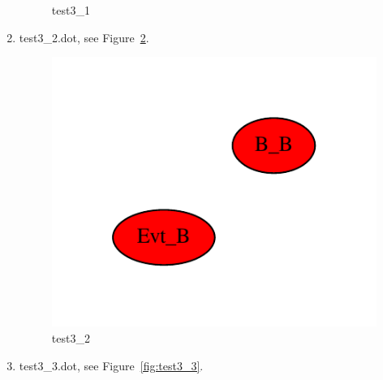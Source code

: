 \documentclass[12pt,a4paper]{report}
\begin{document}
\begin{enumerate}
\begin{figure}
        \caption{test3\_1}
        \label{fig:test3_1}
    \end{figure}
\item test3\_2.dot, see Figure~\ref{fig:test3_2}.
    \begin{figure}
        \centering 
        \includegraphics*[width=1.0\textwidth,keepaspectratio]{TestPattern/test3_2.pdf}
        \caption{test3\_2}
        \label{fig:test3_2}
    \end{figure}
\item test3\_3.dot, see Figure~\ref{fig:test3_3}.
    \begin{figure}
        \centering 

\end{figure}
\end{enumerate}
\end{document}
